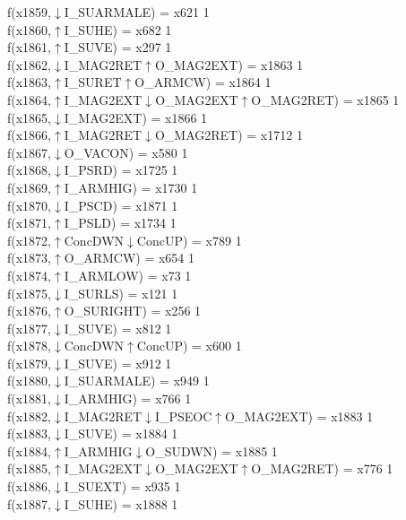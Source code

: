 f(x1859,$\downarrow$I\_SUARMALE) = x621 {1} \\
f(x1860,$\uparrow$I\_SUHE) = x682 {1} \\
f(x1861,$\uparrow$I\_SUVE) = x297 {1} \\
f(x1862,$\downarrow$I\_MAG2RET$\uparrow$O\_MAG2EXT) = x1863 {1} \\
f(x1863,$\uparrow$I\_SURET$\uparrow$O\_ARMCW) = x1864 {1} \\
f(x1864,$\uparrow$I\_MAG2EXT$\downarrow$O\_MAG2EXT$\uparrow$O\_MAG2RET) = x1865 {1} \\
f(x1865,$\downarrow$I\_MAG2EXT) = x1866 {1} \\
f(x1866,$\uparrow$I\_MAG2RET$\downarrow$O\_MAG2RET) = x1712 {1} \\
f(x1867,$\downarrow$O\_VACON) = x580 {1} \\
f(x1868,$\downarrow$I\_PSRD) = x1725 {1} \\
f(x1869,$\uparrow$I\_ARMHIG) = x1730 {1} \\
f(x1870,$\downarrow$I\_PSCD) = x1871 {1} \\
f(x1871,$\uparrow$I\_PSLD) = x1734 {1} \\
f(x1872,$\uparrow$ConcDWN$\downarrow$ConcUP) = x789 {1} \\
f(x1873,$\uparrow$O\_ARMCW) = x654 {1} \\
f(x1874,$\uparrow$I\_ARMLOW) = x73 {1} \\
f(x1875,$\downarrow$I\_SURLS) = x121 {1} \\
f(x1876,$\uparrow$O\_SURIGHT) = x256 {1} \\
f(x1877,$\downarrow$I\_SUVE) = x812 {1} \\
f(x1878,$\downarrow$ConcDWN$\uparrow$ConcUP) = x600 {1} \\
f(x1879,$\downarrow$I\_SUVE) = x912 {1} \\
f(x1880,$\downarrow$I\_SUARMALE) = x949 {1} \\
f(x1881,$\downarrow$I\_ARMHIG) = x766 {1} \\
f(x1882,$\downarrow$I\_MAG2RET$\downarrow$I\_PSEOC$\uparrow$O\_MAG2EXT) = x1883 {1} \\
f(x1883,$\downarrow$I\_SUVE) = x1884 {1} \\
f(x1884,$\uparrow$I\_ARMHIG$\downarrow$O\_SUDWN) = x1885 {1} \\
f(x1885,$\uparrow$I\_MAG2EXT$\downarrow$O\_MAG2EXT$\uparrow$O\_MAG2RET) = x776 {1} \\
f(x1886,$\downarrow$I\_SUEXT) = x935 {1} \\
f(x1887,$\downarrow$I\_SUHE) = x1888 {1} \\
